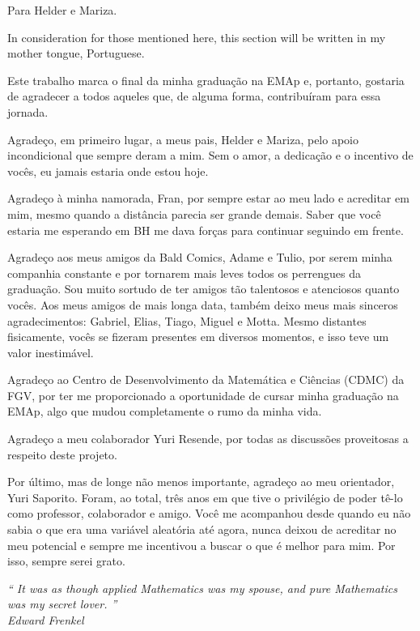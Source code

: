 \newpage

\begin{dedicatoria}
    \vspace*{\fill}
    \hfill
    \begin{minipage}{.6\textwidth}
        Para Helder e Mariza.
    \end{minipage}
\end{dedicatoria}
 
\begin{agradecimentos}
    In consideration for those mentioned here, this section will be written in my mother tongue, Portuguese.

    Este trabalho marca o final da minha graduação na EMAp e, portanto, gostaria de agradecer a todos aqueles que, de alguma forma, contribuíram para essa jornada.

    Agradeço, em primeiro lugar, a meus pais, Helder e Mariza, pelo apoio incondicional que sempre deram a mim.
    Sem o amor, a dedicação e o incentivo de vocês, eu jamais estaria onde estou hoje.
    
    Agradeço à minha namorada, Fran, por sempre estar ao meu lado e acreditar em mim, mesmo quando a distância parecia ser grande demais.
    Saber que você estaria me esperando em BH me dava forças para continuar seguindo em frente.

    Agradeço aos meus amigos da Bald Comics, Adame e Tulio, por serem minha companhia constante e por tornarem mais leves todos os perrengues da graduação.
    Sou muito sortudo de ter amigos tão talentosos e atenciosos quanto vocês.
    Aos meus amigos de mais longa data, também deixo meus mais sinceros agradecimentos: Gabriel, Elias, Tiago, Miguel e Motta.
    Mesmo distantes fisicamente, vocês se fizeram presentes em diversos momentos, e isso teve um valor inestimável.

    Agradeço ao Centro de Desenvolvimento da Matemática e Ciências (CDMC) da FGV, por ter me proporcionado a oportunidade de cursar minha graduação na EMAp, algo que mudou completamente o rumo da minha vida.

    Agradeço a meu colaborador Yuri Resende, por todas as discussões proveitosas a respeito deste projeto.

    Por último, mas de longe não menos importante, agradeço ao meu orientador, Yuri Saporito.
    Foram, ao total, três anos em que tive o privilégio de poder tê-lo como professor, colaborador e amigo.
    Você me acompanhou desde quando eu não sabia o que era uma variável aleatória até agora, nunca deixou de acreditar no meu potencial e sempre me incentivou a buscar o que é melhor para mim.
    Por isso, sempre serei grato.
\end{agradecimentos}

\begin{epigrafe}
\vspace*{\fill}

\begin{flushright}
    \hspace{7.5cm}
    \textit{
        ``
        It was as though applied Mathematics was my spouse, and pure Mathematics was my secret lover.
        ''
    } \\
        \textit{Edward Frenkel}
\end{flushright}
\end{epigrafe}

